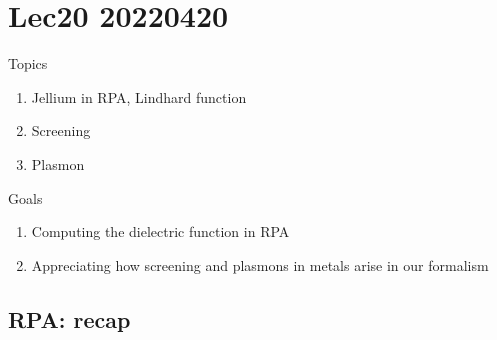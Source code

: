 \chapter{Lec20 20220420}

Topics

\begin{enumerate}
    \item Jellium in RPA, Lindhard function
    \item Screening
    \item Plasmon
\end{enumerate}

Goals

\begin{enumerate}
    \item Computing the dielectric function in RPA
    \item Appreciating how screening and plasmons in metals arise in our formalism
\end{enumerate}

\section{RPA: recap}

